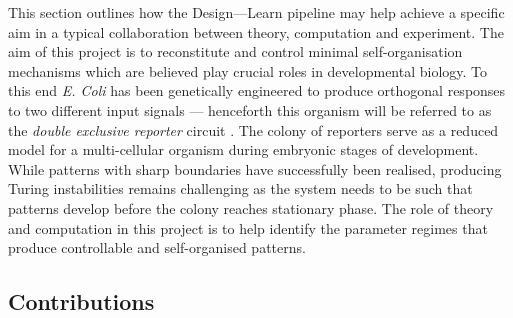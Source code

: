 This section outlines how the Design---Learn pipeline may help achieve a specific
aim in a typical collaboration between theory, computation and experiment.
The aim of this project is to reconstitute and control minimal self-organisation
mechanisms which are believed play crucial roles in developmental biology. To this
end \textit{E. Coli} has been genetically engineered to produce orthogonal responses
to two different input signals --- henceforth this organism will be referred to as the
\textit{double exclusive reporter} circuit \cite{Grant2016}. The colony of reporters
serve as a reduced model for a multi-cellular organism during embryonic stages of
development. While patterns with sharp boundaries have successfully been realised,
producing Turing instabilities remains challenging as the system needs to be such
that patterns develop before the colony reaches stationary phase.
The role of theory and computation in this project is to help identify the
parameter regimes that produce controllable and self-organised patterns.

\subsection{Contributions}

